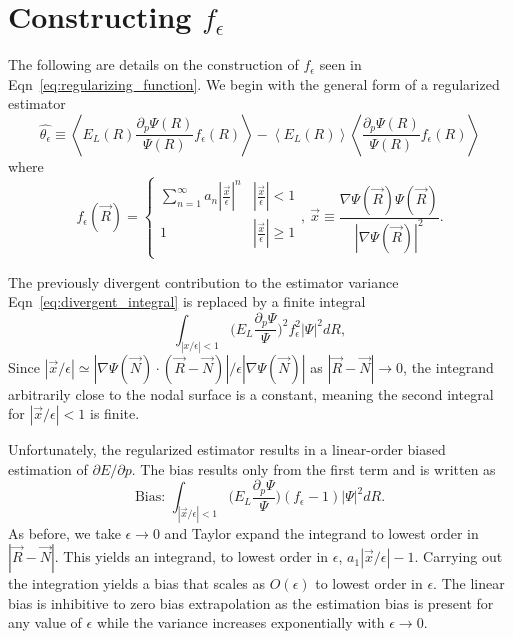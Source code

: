 \documentclass[twocolumn]{revtex4-1}
\begin{document}
%


\appendix*
\section{Constructing $f_\epsilon$}
The following are details on the construction of $f_\epsilon$ seen in Eqn~\ref{eq:regularizing_function}. 
We begin with the general form of a regularized estimator
$$
\hat{\theta_\epsilon} \equiv
\left\langle E_L(R) \frac{\partial_p \Psi(R)}{\Psi(R)} f_\epsilon(R) \right\rangle - \left\langle E_L(R) \right \rangle \left \langle \frac{\partial_p \Psi(R)}{\Psi(R)} f_\epsilon(R) \right\rangle
$$
where 
\begin{equation}
f_\epsilon(\vec{R}) = \begin{cases} 
      \sum_{n=1}^{\infty} a_n |\frac{\vec{x}}{\epsilon}|^n & |\frac{\vec{x}}{\epsilon}| < 1 \\
      1 & |\frac{\vec{x}}{\epsilon}| \ge 1 \\
   \end{cases},\ \vec{x} \equiv \frac{\nabla \Psi(\vec{R}) \Psi(\vec{R})}{|\nabla \Psi(\vec{R})|^2}.
\end{equation} 

The previously divergent contribution to the estimator variance Eqn~\ref{eq:divergent_integral} is replaced by a finite integral
$$ \int_{|x/\epsilon|< 1} \Big(E_L\frac{\partial_p\Psi}{\Psi}\Big)^2 f_\epsilon^2 |\Psi|^2 dR,
$$
Since $|\vec{x}/\epsilon| \simeq |\nabla\Psi(\vec{N}) \cdot (\vec{R}-\vec{N})|/\epsilon|\nabla  \Psi(\vec{N})|$ as $|\vec{R} - \vec{N}| \rightarrow 0$, the integrand arbitrarily close to the nodal surface is a constant, meaning the second integral for $|\vec{x}/\epsilon| < 1$ is finite.

Unfortunately, the regularized estimator results in a linear-order biased estimation of $\partial E/\partial p$.
The bias results only from the first term and is written as 
$$
\text{Bias: } \int_{|\vec{x}/\epsilon|< 1} \Big(E_L\frac{\partial_p\Psi}{\Psi}\Big) (f_\epsilon - 1)|\Psi|^2 dR.
$$
As before, we take $\epsilon \rightarrow 0$ and Taylor expand the integrand to lowest order in $|\vec{R}-\vec{N}|$.
This yields an integrand, to lowest order in $\epsilon$, $a_1|\vec{x}/\epsilon| - 1$.
Carrying out the integration yields a bias that scales as $O(\epsilon)$ to lowest order in $\epsilon$.
The linear bias is inhibitive to zero bias extrapolation as the estimation bias is present for any value of $\epsilon$ while the variance increases exponentially with $\epsilon \rightarrow 0$.
\end{document}
